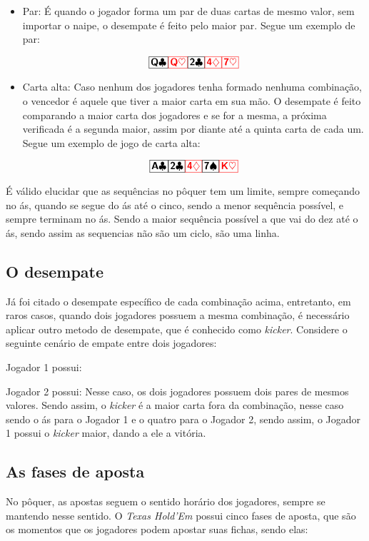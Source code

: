 \begin{itemize}
            $$ \Ac \Ah \twoc \twoh \tres$$
      \item Par:
            É quando o jogador forma um par de duas cartas de mesmo valor, sem importar o naipe, o desempate é feito pelo maior par. Segue um exemplo de par:

            $$ \Qc \Qh \twoc \fourd \sevh$$
      \item Carta alta:
            Caso nenhum dos jogadores tenha formado nenhuma combinação, o vencedor é aquele que tiver a maior carta em sua mão. O desempate é feito comparando a maior carta dos jogadores e se for a mesma, a próxima verificada é a segunda maior, assim por diante até a quinta carta de cada um. Segue um exemplo de jogo de carta alta:

            $$ \Ac \twoc \fourd \sevs \Kh$$
\end{itemize}

É válido elucidar que as sequências no pôquer tem um limite, sempre começando no ás, quando se segue do ás até o cinco, sendo a menor sequência possível, e sempre terminam no ás. Sendo a maior sequência possível a que vai do dez até o ás, sendo assim as sequencias não são um ciclo, são uma linha.

\subsection{O desempate}
Já foi citado o desempate específico de cada combinação acima, entretanto, em raros casos, quando dois jogadores possuem a mesma combinação, é necessário aplicar outro metodo de desempate, que é conhecido como \textit{kicker}. Considere o seguinte cenário de empate entre dois jogadores:

Jogador 1 possui: \fivec \fived \twoc \twod \Ah

Jogador 2 possui: \fiveh \fives \twoh \twos \fourd
Nesse caso, os dois jogadores possuem dois pares de mesmos valores. Sendo assim, o \textit{kicker} é a maior carta fora da combinação, nesse caso sendo o ás para o Jogador 1 e o quatro para o Jogador 2, sendo assim, o Jogador 1 possui o \textit{kicker} maior, dando a ele a vitória.

\subsection{As fases de aposta}

No pôquer, as apostas seguem o sentido horário dos jogadores, sempre se mantendo nesse sentido.
O \textit{Texas Hold'Em} possui cinco fases de aposta, que são os momentos que os jogadores podem apostar suas fichas, sendo elas:

